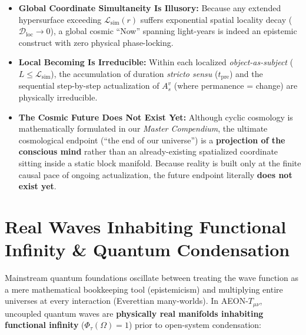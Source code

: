 \documentclass[11pt,a4paper]{article}
\begin{document}
\begin{itemize}
    \item \textbf{Global Coordinate Simultaneity Is Illusory:} Because any extended hypersurface exceeding $\mathcal{L}_{\mathrm{sim}}(r)$ suffers exponential spatial locality decay ($\mathcal{D}_{\mathrm{loc}} \to 0$), a global cosmic ``Now'' spanning light-years is indeed an epistemic construct with zero physical phase-locking.
    \item \textbf{Local Becoming Is Irreducible:} Within each localized \emph{object-as-subject} ($L \le \mathcal{L}_{\mathrm{sim}}$), the accumulation of duration \emph{stricto sensu} ($t_{\mathrm{pre}}$) and the sequential step-by-step actualization of $A_s^v$ (where permanence = change) are physically irreducible.
    \item \textbf{The Cosmic Future Does Not Exist Yet:} Although cyclic cosmology is mathematically formulated in our \emph{Master Compendium}, the ultimate cosmological endpoint (``the end of our universe'') is a \textbf{projection of the conscious mind} rather than an already-existing spatialized coordinate sitting inside a static block manifold. Because reality is built only at the finite causal pace of ongoing actualization, the future endpoint literally \textbf{does not exist yet}.
\end{itemize}

\section{Real Waves Inhabiting Functional Infinity \& Quantum Condensation}

Mainstream quantum foundations oscillate between treating the wave function as a mere mathematical bookkeeping tool (epistemicism) and multiplying entire universes at every interaction (Everettian many-worlds). In AEON-$T_{\mu\nu}$, uncoupled quantum waves are \textbf{physically real manifolds inhabiting functional infinity} ($\Phi_\tau(\Omega) = 1$) prior to open-system condensation:
\end{document}
